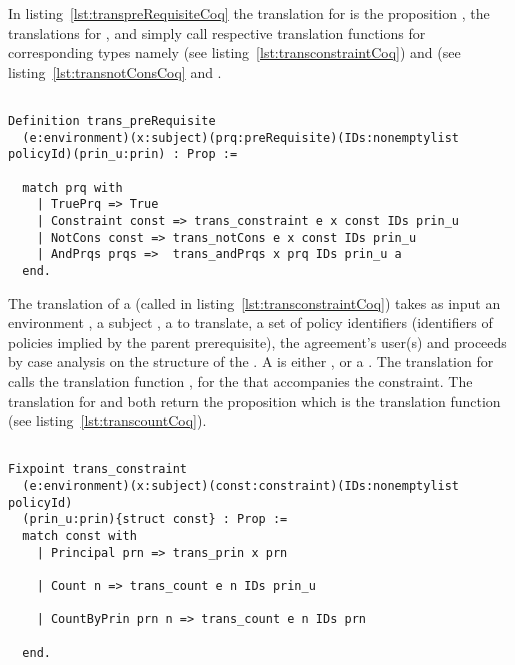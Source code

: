 In listing~\ref{lst:transpreRequisiteCoq} the translation for  is the proposition , the translations for ,  and  simply call respective translation functions for corresponding types namely  (see listing~\ref{lst:transconstraintCoq}) and  (see listing~\ref{lst:transnotConsCoq} and . 


\begin{minipage}[c]{0.95\textwidth}
\begin{lstlisting}

Definition trans_preRequisite
  (e:environment)(x:subject)(prq:preRequisite)(IDs:nonemptylist policyId)(prin_u:prin) : Prop := 

  match prq with
    | TruePrq => True
    | Constraint const => trans_constraint e x const IDs prin_u  
    | NotCons const => trans_notCons e x const IDs prin_u 
    | AndPrqs prqs =>  trans_andPrqs x prq IDs prin_u a
  end.
\end{lstlisting}
\end{minipage}

The translation of a  (called  in listing~\ref{lst:transconstraintCoq}) takes as input 
an environment , a subject , a   to translate, a set of policy identifiers  (identifiers of policies implied by the parent prerequisite), the agreement's user(s)  and proceeds by case analysis on the structure of the . A  is either ,  or a . The translation for  calls the translation function , for the  that accompanies the  constraint. The translation for  and  both return the proposition which is the translation function  (see listing~\ref{lst:transcountCoq}).


\begin{minipage}[c]{0.95\textwidth}
\begin{lstlisting}

Fixpoint trans_constraint 
  (e:environment)(x:subject)(const:constraint)(IDs:nonemptylist policyId)
  (prin_u:prin){struct const} : Prop := 
  match const with
    | Principal prn => trans_prin x prn
  
    | Count n => trans_count e n IDs prin_u

    | CountByPrin prn n => trans_count e n IDs prn 

  end.
  
\end{lstlisting}
\end{minipage}

